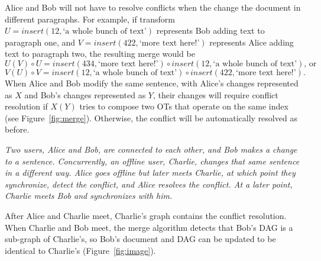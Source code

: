 \documentclass[11pt,titlepage]{article}
\begin{document}
Alice and Bob will not have to resolve conflicts when the change the
document in different paragraphs. For example, if transform $U =
insert(12, \text{`a whole bunch of text'})$ represents Bob adding text
to paragraph one, and $V = insert(422, \text{`more text here!'})$
represents Alice adding text to paragraph two, the resulting merge
would be
\begin{equation*}
  U(V)\circ U = insert(434, \text{`more text
    here!'})\circ insert(12, \text{`a whole bunch of text'})\text{, or}
\end{equation*}
\begin{equation*}
  V(U)\circ V = insert(12, \text{`a whole bunch of text'})\circ
  insert(422, \text{`more text here!'}).
\end{equation*}
When Alice and Bob modify the same sentence, with Alice's changes
represented as $X$ and Bob's changes represented as $Y$, their changes
will require conflict resolution if $X(Y)$ tries to compose two OTs
that operate on the same index (see
Figure~\ref{fig:merge}). Otherwise, the conflict will be automatically
resolved as before.

\vspace{5mm}
\noindent
\emph{Two users, Alice and Bob, are connected to each other, and Bob
  makes a change to a sentence. Concurrently, an offline user,
  Charlie, changes that same sentence in a different way. Alice goes
  offline but later meets Charlie, at which point they synchronize,
  detect the conflict, and Alice resolves the conflict. At a later
  point, Charlie meets Bob and synchronizes with him.}

\vspace{5mm}

After Alice and Charlie meet, Charlie's graph contains the conflict
resolution.  When Charlie and Bob meet, the merge algorithm detects
that Bob's DAG is a sub-graph of Charlie's, so Bob's document and DAG
can be updated to be identical to Charlie's (Figure~\ref{fig:image}).
\end{document}

